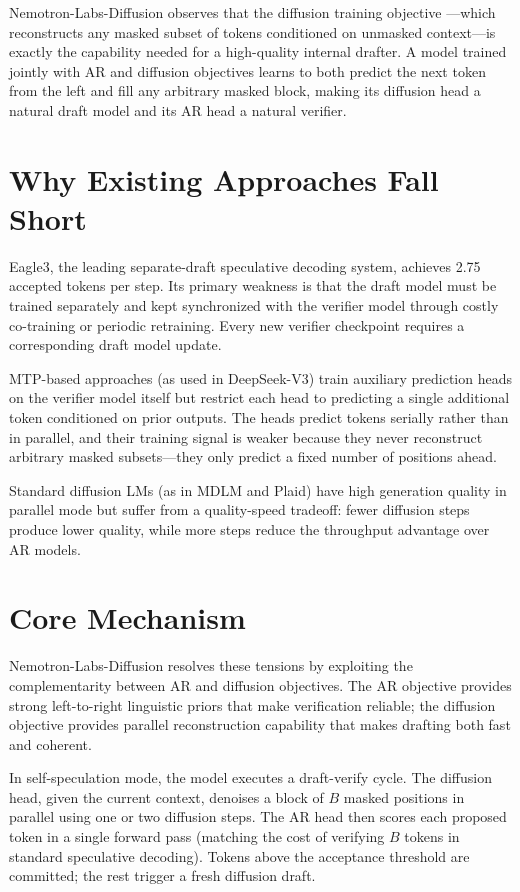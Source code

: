 \documentclass[10pt,twocolumn]{article}
\begin{document}
Nemotron-Labs-Diffusion observes that the diffusion training objective
---which reconstructs any masked subset of tokens conditioned on
unmasked context---is exactly the capability needed for a
high-quality internal drafter. A model trained jointly with AR and
diffusion objectives learns to both predict the next token from the left
and fill any arbitrary masked block, making its diffusion head a natural
draft model and its AR head a natural verifier.

\section{Why Existing Approaches Fall Short}

Eagle3, the leading separate-draft speculative decoding system, achieves
2.75 accepted tokens per step. Its primary weakness is that the draft
model must be trained separately and kept synchronized with the verifier
model through costly co-training or periodic retraining. Every new
verifier checkpoint requires a corresponding draft model update.

MTP-based approaches (as used in DeepSeek-V3) train auxiliary prediction
heads on the verifier model itself but restrict each head to predicting
a single additional token conditioned on prior outputs. The heads predict
tokens serially rather than in parallel, and their training signal is
weaker because they never reconstruct arbitrary masked subsets---they
only predict a fixed number of positions ahead.

Standard diffusion LMs (as in MDLM and Plaid) have high generation
quality in parallel mode but suffer from a quality-speed tradeoff:
fewer diffusion steps produce lower quality, while more steps reduce
the throughput advantage over AR models.

\section{Core Mechanism}

Nemotron-Labs-Diffusion resolves these tensions by exploiting the
complementarity between AR and diffusion objectives. The AR objective
provides strong left-to-right linguistic priors that make verification
reliable; the diffusion objective provides parallel reconstruction
capability that makes drafting both fast and coherent.

In self-speculation mode, the model executes a draft-verify cycle.
The diffusion head, given the current context, denoises a block of
$B$ masked positions in parallel using one or two diffusion steps.
The AR head then scores each proposed token in a single forward pass
(matching the cost of verifying $B$ tokens in standard speculative
decoding). Tokens above the acceptance threshold are committed; the
rest trigger a fresh diffusion draft.
\end{document}
